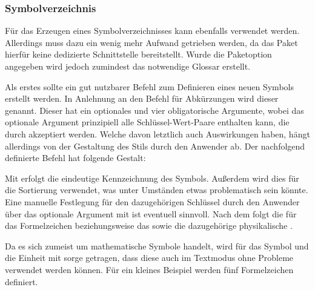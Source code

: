 \documentclass[%
  english,ngerman,%
  geometry=no,DIV=12,automark,%
]{tudscrartcl}
\begin{document}
\subsubsection{Symbolverzeichnis}
Für das Erzeugen eines Symbolverzeichnisses kann ebenfalls  
verwendet werden. Allerdings muss dazu ein wenig mehr Aufwand getrieben werden, 
da das Paket hierfür keine dedizierte Schnittstelle bereitstellt. Wurde die 
Paketoption  angegeben wird jedoch zumindest das notwendige 
Glossar erstellt.

Als erstes sollte ein gut nutzbarer Befehl zum Definieren eines neuen Symbols 
erstellt werden. In Anlehnung an den Befehl für Abkürzungen wird dieser 
 genannt. Dieser hat ein optionales und vier obligatorische 
Argumente, wobei das optionale Argument prinzipiell alle Schlüssel-Wert-Paare 
enthalten kann, die durch  akzeptiert werden. Welche davon 
letztlich auch Auswirkungen haben, hängt allerdings von der Gestaltung des 
Stils durch den Anwender ab. Der nachfolgend definierte Befehl hat folgende 
Gestalt:
%
\begin{quoting}[leftmargin=\parindent]
\LParameter{}%
\end{quoting}
%
Mit  erfolgt die eindeutige Kennzeichnung des Symbols. Außerdem 
wird dies für die Sortierung verwendet, was unter Umständen etwas problematisch 
sein könnte. Eine manuelle Festlegung für den dazugehörigen Schlüssel durch den 
Anwender über das optionale Argument mit  ist 
eventuell sinnvoll. Nach dem  folgt die  für 
das Formelzeichen beziehungsweise das  sowie die dazugehörige 
physikalische .
%
\InputHook{\let\newcommand\renewcommand}
\begin{Excerpt}
\newcommand*{\newsymbol}[5][]{%
  \newglossaryentry{#2}{%
    type=symbols,%
    description={},%
    name={#3},%
    symbol={\ensuremath{#4}},%
    user1={\ensuremath{\mathrm{#5}}},%
    sort={#2},%
    #1%
  }%
}
\end{Excerpt}
%
Da es sich zumeist um mathematische Symbole handelt, wird für das Symbol und 
die Einheit mit  sorge getragen, dass diese auch im 
Textmodus ohne Probleme verwendet werden können. Für ein kleines Beispiel 
werden fünf Formelzeichen definiert.
%
\begin{Excerpt}
\end{Excerpt}
\end{document}
